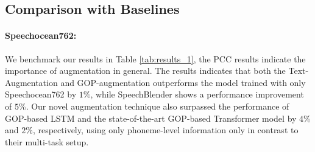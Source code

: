 \documentclass{INTERSPEECH2023}
\begin{document}
\subsection{Comparison with Baselines}
\paragraph*{Speechocean762:} 
We benchmark our results in Table \ref{tab:results_1}, the PCC results indicate the importance of augmentation in general. 
The results indicates that both the Text-Augmentation and GOP-augmentation outperforms the model trained with only Speechocean762 by $1\%$, while SpeechBlender shows a performance improvement of $5\%$.
Our novel augmentation technique also surpassed the performance of GOP-based LSTM \cite{JIM} and the
state-of-the-art GOP-based Transformer model \cite{JIM} by $4$\% and $2\%$, respectively, using only phoneme-level information only in contrast to their multi-task setup. 
\end{document}
